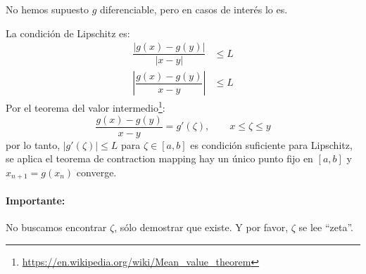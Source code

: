 \documentclass[english, spanish, fleqn, 10pt]{article}
\newcommand{\comillas}[1]{``#1''}
\numberwithin{equation}{section}
\newcommand{\nparentesis}[1]{\left( #1 \right)}
\newcommand{\nabsoluto}[1]{\left| #1 \right|}
\newcommand{\ncorchetes}[1]{\left[ #1 \right]}
\theoremstyle{definition}
\begin{document}
No hemos supuesto $g$ diferenciable, pero en casos de interés lo es.

La condición de Lipschitz es:
\begin{align*}
	\dfrac{\nabsoluto{g\nparentesis{x}-g\nparentesis{y}}}{\nabsoluto{x-y}}&\leq L\\
	\nabsoluto{\dfrac{g\nparentesis{x}-g\nparentesis{y}}{x-y}}&\leq L
\end{align*}
Por el teorema del valor intermedio\footnote{\url{https://en.wikipedia.org/wiki/Mean_value_theorem}}:
\begin{equation}
\dfrac{g\nparentesis{x}-g\nparentesis{y}}{x-y}=g'\nparentesis{\zeta}, \qquad x\leq \zeta \leq y
\end{equation}
por lo tanto, $\nabsoluto{g'\nparentesis{\zeta}}\leq L$ para $\zeta \in \ncorchetes{a, b}$ es condición suficiente para Lipschitz, se aplica el teorema de contraction mapping hay un único punto fijo en $\ncorchetes{a, b}$ y $x_{n+1}=g\nparentesis{x_n}$ converge.

\paragraph{Importante:} No buscamos encontrar $\zeta$, sólo demostrar que existe. Y por favor, $\zeta$ se lee \comillas{zeta}.
\end{document}
